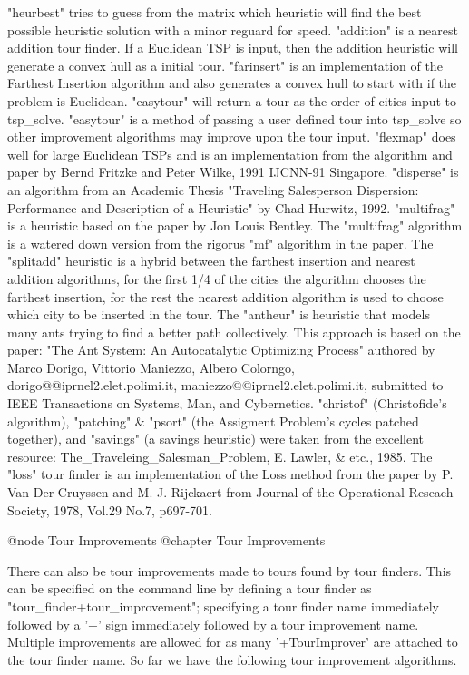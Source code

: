 "heurbest" tries to guess from the matrix which heuristic will find the best
possible heuristic solution with a minor reguard for speed.  "addition"
is a nearest addition tour finder.  If a Euclidean TSP is input, then
the addition heuristic will generate a convex hull as a initial tour.
"farinsert" is an implementation of the Farthest Insertion algorithm and
also generates a convex hull to start with if the problem is Euclidean.
"easytour" will return a tour as the order of cities input to tsp_solve.
"easytour" is a method of passing a user defined tour into tsp_solve so
other improvement algorithms may improve upon the tour input.  "flexmap"
does well for large Euclidean TSPs and is an implementation from the
algorithm and paper by Bernd Fritzke and Peter Wilke, 1991 IJCNN-91
Singapore.  "disperse" is an algorithm from an Academic Thesis "Traveling
Salesperson Dispersion: Performance and Description of a Heuristic" by
Chad Hurwitz, 1992.  "multifrag" is a heuristic based on the paper by Jon
Louis Bentley.  The "multifrag" algorithm is a watered down version from
the rigorus "mf" algorithm in the paper.  The "splitadd" heuristic is a
hybrid between the farthest insertion and nearest addition algorithms, for
the first 1/4 of the cities the algorithm chooses the farthest insertion,
for the rest the nearest addition algorithm is used to choose which city
to be inserted in the tour.  The "antheur" is heuristic that models
many ants trying to find a better path collectively.  This approach
is based on the paper: "The Ant System: An Autocatalytic Optimizing
Process" authored by Marco Dorigo, Vittorio Maniezzo, Albero Colorngo,
dorigo@@iprnel2.elet.polimi.it, maniezzo@@iprnel2.elet.polimi.it,
submitted to IEEE Transactions on Systems, Man, and Cybernetics.
"christof" (Christofide's algorithm), "patching" & "psort" (the Assigment
Problem's cycles patched together), and "savings" (a savings heuristic)
were taken from the excellent resource: The_Traveleing_Salesman_Problem, E.
Lawler, & etc., 1985.  The "loss" tour finder is an implementation of the
Loss method from the paper by P. Van Der Cruyssen and M. J. Rijckaert from
Journal of the Operational Reseach Society, 1978, Vol.29 No.7, p697-701.

@node Tour Improvements
@chapter Tour Improvements

There can also be tour improvements made to tours found by tour finders.
This can be specified on the command line by defining a tour finder as
"tour_finder+tour_improvement"; specifying a tour finder name immediately
followed by a '+' sign immediately followed by a tour improvement name.
Multiple improvements are allowed for as many '+TourImprover' are
attached to the tour finder name.  So far we have the following
tour improvement algorithms.

